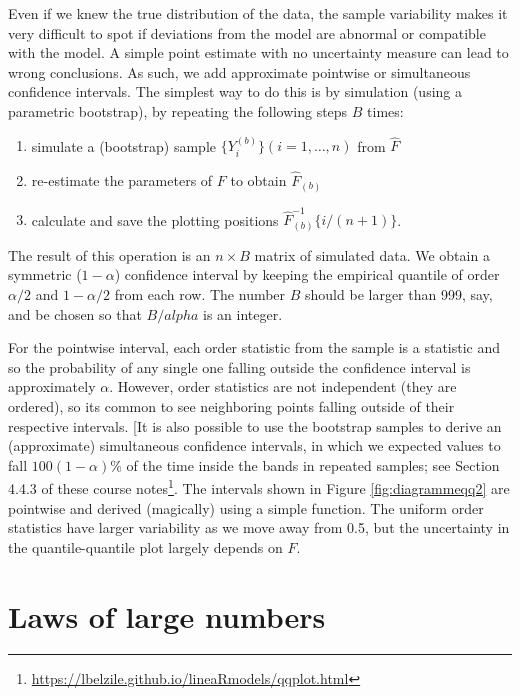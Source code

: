 \documentclass[
  11pt,
  letterpaper,
]{book}
\providecommand{\tightlist}{%
  \setlength{\itemsep}{0pt}\setlength{\parskip}{0pt}}
\renewcommand{\href}[2]{#2\footnote{\url{#1}}}
\theoremstyle{definition}
\theoremstyle{definition}
\theoremstyle{definition}
\theoremstyle{remark}
\begin{document}
Even if we knew the true distribution of the data, the sample variability makes it very difficult to spot if deviations from the model are abnormal or compatible with the model. A simple point estimate with no uncertainty measure can lead to wrong conclusions. As such, we add approximate pointwise or simultaneous confidence intervals. The simplest way to do this is by simulation (using a parametric bootstrap), by repeating the following steps \(B\) times:

\begin{enumerate}
\def\labelenumi{\arabic{enumi}.}
\tightlist
\item
  simulate a (bootstrap) sample \(\{Y^{(b)}_{i}\} (i=1,\ldots, n)\) from \(\widehat{F}\)
\item
  re-estimate the parameters of \(F\) to obtain \(\widehat{F}_{(b)}\)
\item
  calculate and save the plotting positions \(\widehat{F}^{-1}_{(b)}\{i/(n+1)\}\).
\end{enumerate}

The result of this operation is an \(n \times B\) matrix of simulated data. We obtain a symmetric (\(1-\alpha\)) confidence interval by keeping the empirical quantile of order \(\alpha/2\) and \(1-\alpha/2\) from each row. The number \(B\) should be larger than 999, say, and be chosen so that \(B/alpha\) is an integer.

For the pointwise interval, each order statistic from the sample is a statistic and so the probability of any single one falling outside the confidence interval is approximately \(\alpha\). However, order statistics are not independent (they are ordered), so its common to see neighboring points falling outside of their respective intervals. {[}It is also possible to use the bootstrap samples to derive an (approximate) simultaneous confidence intervals, in which we expected values to fall \(100(1-\alpha)\)\% of the time inside the bands in repeated samples; \href{https://lbelzile.github.io/lineaRmodels/qqplot.html}{see Section 4.4.3 of these course notes}. The intervals shown in Figure \ref{fig:diagrammeqq2} are pointwise and derived (magically) using a simple function. The uniform order statistics have larger variability as we move away from 0.5, but the uncertainty in the quantile-quantile plot largely depends on \(F\).

\hypertarget{law-large-numbers}{%
\section{Laws of large numbers}\label{law-large-numbers}}
\end{document}
